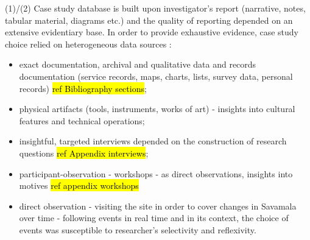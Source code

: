 \documentclass[11pt]{report}
\begin{document}
(1)/(2) Case study database is built upon investigator's report (narrative, notes, tabular material, diagrams etc.) and the quality of reporting depended on an extensive evidentiary base. In order to provide exhaustive evidence, case study choice relied on heterogeneous data sources \cite{(Yin XXX)}:
\begin{itemize}
\item exact documentation, archival and qualitative data and records documentation (service records, maps, charts, lists, survey data, personal records) \hl{ref Bibliography sections};
\item physical artifacts (tools, instruments, works of art) - insights into cultural features and technical operations;
\item insightful, targeted interviews depended on the construction of research questions \hl{ref Appendix interviews};
\item participant-observation - workshops -  as direct observations, insights into motives \hl{ref appendix workshops}
\item direct observation - visiting the site in order to cover changes in Savamala over time -  following events in real time and in its context, the choice of events was susceptible to researcher's  selectivity and reflexivity.
\end{itemize}
\end{document}
